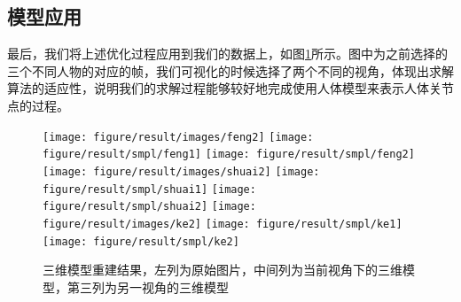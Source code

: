 
\subsection{模型应用}
最后，我们将上述优化过程应用到我们的数据上，如图\ref{fig:smpljoint}所示。图中为之前选择的三个不同人物的对应的帧，我们可视化的时候选择了两个不同的视角，体现出求解算法的适应性，说明我们的求解过程能够较好地完成使用人体模型来表示人体关节点的过程。
\begin{figure}[htbp]
    \centering
    \texttt{[image: figure/result/images/feng2]} \hfill
    \texttt{[image: figure/result/smpl/feng1]} \hfill
    \texttt{[image: figure/result/smpl/feng2]} \hfill
    \texttt{[image: figure/result/images/shuai2]} \hfill
    \texttt{[image: figure/result/smpl/shuai1]} \hfill
    \texttt{[image: figure/result/smpl/shuai2]} \hfill
    \texttt{[image: figure/result/images/ke2]} \hfill
    \texttt{[image: figure/result/smpl/ke1]} \hfill
    \texttt{[image: figure/result/smpl/ke2]} 
    \caption{三维模型重建结果，左列为原始图片，中间列为当前视角下的三维模型，第三列为另一视角的三维模型\label{fig:smpljoint}}
\end{figure}
